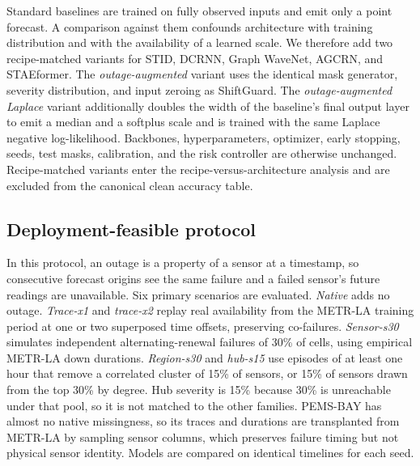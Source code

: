 \documentclass[preprint,12pt]{elsarticle}
\begin{document}
Standard baselines are trained on fully observed inputs and emit only a point
forecast. A comparison against them confounds architecture with training
distribution and with the availability of a learned scale. We therefore add two
recipe-matched variants for STID, DCRNN, Graph WaveNet, AGCRN, and STAEformer.
The \emph{outage-augmented} variant uses the identical mask generator,
severity distribution, and input zeroing as ShiftGuard. The
\emph{outage-augmented Laplace} variant additionally doubles the width of the
baseline's final output layer to emit a median and a softplus scale and is
trained with the same Laplace negative log-likelihood. Backbones,
hyperparameters, optimizer, early stopping, seeds, test masks, calibration, and
the risk controller are otherwise unchanged. Recipe-matched variants enter the
recipe-versus-architecture analysis and are excluded from the canonical clean
accuracy table.
\begin{table}[t]
  \centering
  \caption{Literature-reported point accuracy for context only. Protocol and
  implementation differences prohibit direct significance comparisons with
  locally reproduced results.}
  \label{tab:reported-context}
  \resizebox{\textwidth}{!}{}
\end{table}

\subsection{Deployment-feasible protocol}
\label{sec:deployment-protocol}
In this protocol, an outage is a property of a sensor at a timestamp, so
consecutive forecast origins see the same failure and a failed sensor's future
readings are unavailable. Six primary scenarios are evaluated. \emph{Native} adds
no outage. \emph{Trace-x1} and \emph{trace-x2} replay real availability from the
METR-LA training period at one or two superposed time offsets, preserving
co-failures. \emph{Sensor-s30} simulates independent alternating-renewal failures
of 30\% of cells, using empirical METR-LA down durations. \emph{Region-s30} and
\emph{hub-s15} use episodes of at least one hour that remove a correlated cluster
of 15\% of sensors, or 15\% of sensors drawn from the top 30\% by degree. Hub
severity is 15\% because 30\% is unreachable under that pool, so it is not
matched to the other families. PEMS-BAY has almost no native missingness, so its
traces and durations are transplanted from METR-LA by sampling sensor columns,
which preserves failure timing but not physical sensor identity. Models are
compared on identical timelines for each seed.
\end{document}
